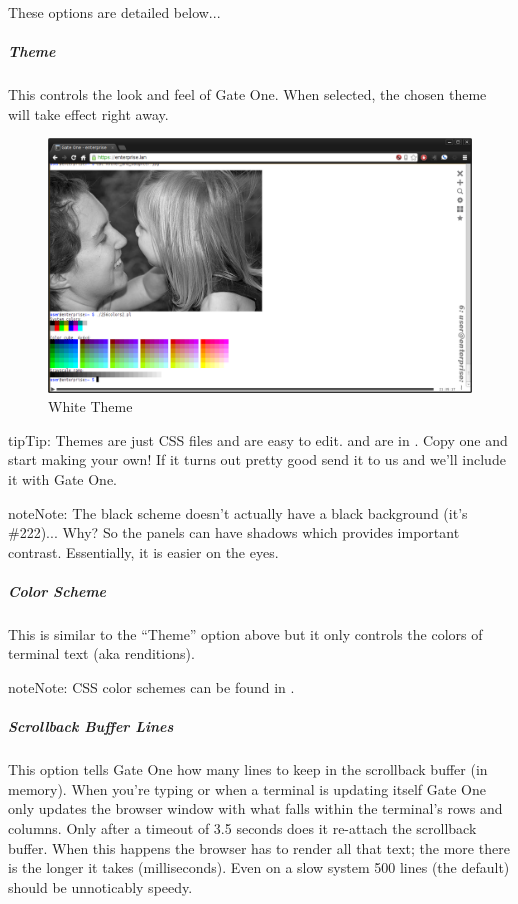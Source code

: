 \documentclass[letterpaper,10pt,openany]{sphinxmanual}
\begin{document}
These options are detailed below...


\subparagraph{Theme}
\label{Applications/terminal/userguide:theme}
This controls the look and feel of Gate One.  When selected, the chosen theme will take effect right away.
\begin{figure}[htbp]
\centering
\capstart

\includegraphics{gateone_white_theme.png}
\caption{White Theme}\end{figure}

\begin{notice}{tip}{Tip:}
Themes are just CSS files and are easy to edit.   and  are in .  Copy one and start making your own!  If it turns out pretty good send it to us and we'll include it with Gate One.
\end{notice}

\begin{notice}{note}{Note:}
The black scheme doesn't actually have a black background (it's \#222)...  Why?  So the panels can have shadows which provides important contrast.  Essentially, it is easier on the eyes.
\end{notice}


\subparagraph{Color Scheme}
\label{Applications/terminal/userguide:color-scheme}
This is similar to the ``Theme'' option above but it only controls the colors of terminal text (aka renditions).

\begin{notice}{note}{Note:}
CSS color schemes can be found in .
\end{notice}


\subparagraph{Scrollback Buffer Lines}
\label{Applications/terminal/userguide:scrollback-buffer-lines}
This option tells Gate One how many lines to keep in the scrollback buffer (in memory).  When you're typing or when a terminal is updating itself Gate One only updates the browser window with what falls within the terminal's rows and columns.  Only after a timeout of 3.5 seconds does it re-attach the scrollback buffer.  When this happens the browser has to render all that text; the more there is the longer it takes (milliseconds).  Even on a slow system 500 lines (the default) should be unnoticably speedy.
\end{document}
